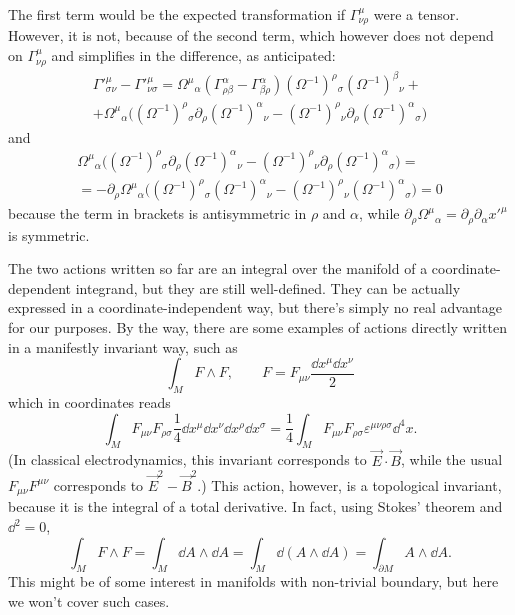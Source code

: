 \documentclass[a4paper,12pt]{book}
\begin{document}
The first term would be the expected transformation if $\Gamma^\mu_{\nu\rho}$ were a tensor. However, it is not, because of the second term, which however does not depend on $\Gamma^\mu_{\nu\rho}$ and simplifies in the difference, as anticipated:
\begin{multline*}\Gamma'^\mu_{\sigma\nu}-\Gamma'^\mu_{\nu\sigma}=\Omega^\mu{}_\alpha(\Gamma^\alpha_{\rho\beta}-\Gamma^\alpha_{\beta\rho})(\Omega^{-1})^\rho{}_\sigma(\Omega^{-1})^\beta{}_\nu+\\
+\Omega^\mu{}_\alpha\bigl((\Omega^{-1})^\rho{}_\sigma\partial_\rho(\Omega^{-1})^\alpha{}_\nu-(\Omega^{-1})^\rho{}_\nu\partial_\rho(\Omega^{-1})^\alpha{}_\sigma\bigr)
\end{multline*}
and
\begin{multline*}
\Omega^\mu{}_\alpha\bigl((\Omega^{-1})^\rho{}_\sigma\partial_\rho(\Omega^{-1})^\alpha{}_\nu-(\Omega^{-1})^\rho{}_\nu\partial_\rho(\Omega^{-1})^\alpha{}_\sigma\bigr)=\\
=-\partial_\rho\Omega^\mu{}_\alpha\bigl((\Omega^{-1})^\rho{}_\sigma(\Omega^{-1})^\alpha{}_\nu-(\Omega^{-1})^\rho{}_\nu(\Omega^{-1})^\alpha{}_\sigma\bigr)=0
\end{multline*}
because the term in brackets is antisymmetric in $\rho$ and $\alpha$, while $\partial_\rho\Omega^\mu{}_\alpha=\partial_\rho\partial_\alpha x'^\mu$ is symmetric.

The two actions written so far are an integral over the manifold of a coordinate-dependent integrand, but they are still well-defined. They can be actually expressed in a coordinate-independent way, but there's simply no real advantage for our purposes. By the way, there are some examples of actions directly written in a manifestly invariant way, such as
\[\int_MF\wedge F,\qquad F=F_{\mu\nu}\frac{\dd x^\mu\dd x^\nu}{2}\]
which in coordinates reads
\[\int_MF_{\mu\nu}F_{\rho\sigma}\frac{1}{4}\dd x^\mu\dd x^\nu\dd x^\rho\dd x^\sigma=\frac{1}{4}\int_MF_{\mu\nu}F_{\rho\sigma}\varepsilon^{\mu\nu\rho\sigma}\dd^4x.\]
(In classical electrodynamics, this invariant corresponds to $\vec E\cdot \vec B$, while the usual $F_{\mu\nu}F^{\mu\nu}$ corresponds to $\vec E^2-\vec B^2$.) This action, however, is a topological invariant, because it is the integral of a total derivative. In fact, using Stokes' theorem and $\dd^2=0$,
\[\int_MF\wedge F=\int_M\dd A\wedge\dd A=\int_M\dd(A\wedge\dd A)=\int_{\partial M}A\wedge\dd A.\]
This might be of some interest in manifolds with non-trivial boundary, but here we won't cover such cases.
\end{document}
